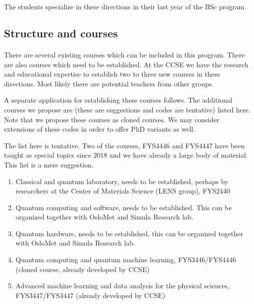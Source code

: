 \documentclass[%
oneside,                 %
final,                   %
10pt]{article}
\begin{document}
\noindent
The students specialize in these directions in their last year of the BSc program.



\subsection*{Structure and courses}

\paragraph{}
There are several existing courses which can be included in this program. There are also courses which need to be established. At the CCSE we have the research and educational expertise to establish two to three new courses in these directions. Most likely there are potential teachers from other groups.

A separate application for establishing these courses follows. The additional courses we propose are (these are suggestions and codes are tentative) listed here. Note that we propose these courses as cloned courses. We may consider extensions of these codes in order to offer PhD variants as well.

The list here is tentative. Two of the courses, FYS4446 and FYS4447 have been taught as special topics since 2018 and we have already a large body of material.
This list is a mere suggestion.

\begin{enumerate}
\item Classical and quantum laboratory, needs to be established, perhaps by researchers at the Center of Materials Science (LENS group), FYS2440

\item Quantum computing and software, needs to be established. This can be organized together with OsloMet and Simula Research lab.

\item Quantum hardware, needs to be established, this can be organized together with OsloMet and Simula Research lab. 

\item Quantum computing and quantum machine learning, FYS3446/FYS4446 (cloned course, already developed by CCSE)

\item Advanced machine learning and data analysis for the physical sciences, FYS3447/FYS4447 (already developed by CCSE)
\end{enumerate}
\end{document}
